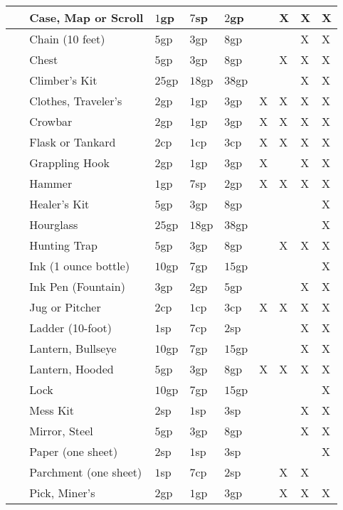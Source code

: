 \documentclass[a5paper,8pt]{book}
\begin{document}
\begin{tabularx}{\textwidth}{|p{0.1cm}lZZZYYYY|}
    ~ & Case, Map or Scroll & $1$gp & $7$sp & $2$gp & ~ & X & X & X \\\hline
    ~ & Chain (10 feet) & $5$gp & $3$gp & $8$gp & ~ & ~ & X & X \\\hline
    ~ & Chest & $5$gp & $3$gp & $8$gp & ~ & X & X & X \\\hline
    ~ & Climber's Kit & $25$gp & $18$gp & $38$gp & ~ & ~ & X & X \\\hline
    ~ & Clothes, Traveler's & $2$gp & $1$gp & $3$gp & X & X & X & X \\\hline
    ~ & Crowbar & $2$gp & $1$gp & $3$gp & X & X & X & X \\\hline
    ~ & Flask or Tankard & $2$cp & $1$cp & $3$cp & X & X & X & X \\\hline
    ~ & Grappling Hook & $2$gp & $1$gp & $3$gp & X & ~ & X & X \\\hline
    ~ & Hammer & $1$gp & $7$sp & $2$gp & X & X & X & X \\\hline
    ~ & Healer's Kit & $5$gp & $3$gp & $8$gp & ~ & ~ & ~ & X \\\hline
    ~ & Hourglass & $25$gp & $18$gp & $38$gp & ~ & ~ & ~ & X \\\hline
    ~ & Hunting Trap & $5$gp & $3$gp & $8$gp & ~ & X & X & X \\\hline
    ~ & Ink (1 ounce bottle) & $10$gp & $7$gp & $15$gp & ~ & ~ & ~ & X \\\hline
    ~ & Ink Pen (Fountain) & $3$gp & $2$gp & $5$gp & ~ & ~ & X & X \\\hline
    ~ & Jug or Pitcher & $2$cp & $1$cp & $3$cp & X & X & X & X \\\hline
    ~ & Ladder (10-foot) & $1$sp & $7$cp & $2$sp & ~ & ~ & X & X \\\hline
    ~ & Lantern, Bullseye & $10$gp & $7$gp & $15$gp & ~ & ~ & X & X \\\hline
    ~ & Lantern, Hooded & $5$gp & $3$gp & $8$gp & X & X & X & X \\\hline
    ~ & Lock & $10$gp & $7$gp & $15$gp & ~ & ~ & ~ & X \\\hline
    ~ & Mess Kit & $2$sp & $1$sp & $3$sp & ~ & ~ & X & X \\\hline
    ~ & Mirror, Steel & $5$gp & $3$gp & $8$gp & ~ & ~ & X & X \\\hline
    ~ & Paper (one sheet) & $2$sp & $1$sp & $3$sp & ~ & ~ & ~ & X \\\hline
    ~ & Parchment (one sheet) & $1$sp & $7$cp & $2$sp & ~ & X & X & ~ \\\hline
    ~ & Pick, Miner's & $2$gp & $1$gp & $3$gp & ~ & X & X & X \\\hline

\end{tabularx}
\end{document}
